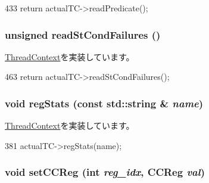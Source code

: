 \begin{DoxyCode}
433 { return actualTC->readPredicate(); }
\end{DoxyCode}
\hypertarget{classProxyThreadContext_a25b995a791e41965e088d8bf3f2bf859}{
\subsubsection[{readStCondFailures}]{\setlength{\rightskip}{0pt plus 5cm}unsigned readStCondFailures ()}}
\label{classProxyThreadContext_a25b995a791e41965e088d8bf3f2bf859}


\hyperlink{classThreadContext_ab1bc64ec54c1cc47c9945fe68fa9e91c}{ThreadContext}を実装しています。


\begin{DoxyCode}
463     { return actualTC->readStCondFailures(); }
\end{DoxyCode}
\hypertarget{classProxyThreadContext_a3dd3443357312bcb75580eaa508c48a4}{
\subsubsection[{regStats}]{\setlength{\rightskip}{0pt plus 5cm}void regStats (const std::string \& {\em name})}}
\label{classProxyThreadContext_a3dd3443357312bcb75580eaa508c48a4}


\hyperlink{classThreadContext_a6450b5fad5603ec545c4bf5ff01e0646}{ThreadContext}を実装しています。


\begin{DoxyCode}
381 { actualTC->regStats(name); }
\end{DoxyCode}
\hypertarget{classProxyThreadContext_afd6c42b1888ad21a4382078ca7a86d09}{
\subsubsection[{setCCReg}]{\setlength{\rightskip}{0pt plus 5cm}void setCCReg (int {\em reg\_\-idx}, \/  {\bf CCReg} {\em val})}}
\label{classProxyThreadContext_afd6c42b1888ad21a4382078ca7a86d09}


